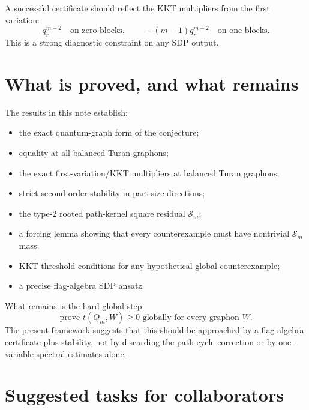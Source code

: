 \documentclass[11pt]{article}
\theoremstyle{definition}
\begin{document}
A successful certificate should reflect the KKT multipliers from the first variation:
\[
        q_r^{m-2}\quad\text{on zero-blocks},
        \qquad
        -(m-1)q_r^{m-2}\quad\text{on one-blocks}.
\]
This is a strong diagnostic constraint on any SDP output.

\section{What is proved, and what remains}

The results in this note establish:
\begin{itemize}[leftmargin=2em]
        \item the exact quantum-graph form of the conjecture;
        \item equality at all balanced Turan graphons;
        \item the exact first-variation/KKT multipliers at balanced Turan graphons;
        \item strict second-order stability in part-size directions;
        \item the type-2 rooted path-kernel square residual $\mathcal S_m$;
        \item a forcing lemma showing that every counterexample must have nontrivial $\mathcal S_m$ mass;
        \item KKT threshold conditions for any hypothetical global counterexample;
        \item a precise flag-algebra SDP ansatz.
\end{itemize}

What remains is the hard global step:
\[
        \text{prove }t(Q_m,W)\ge0\text{ globally for every graphon }W.
\]
The present framework suggests that this should be approached by a flag-algebra certificate plus stability, not by discarding the path-cycle correction or by one-variable spectral estimates alone.

\section{Suggested tasks for collaborators}
\end{document}
